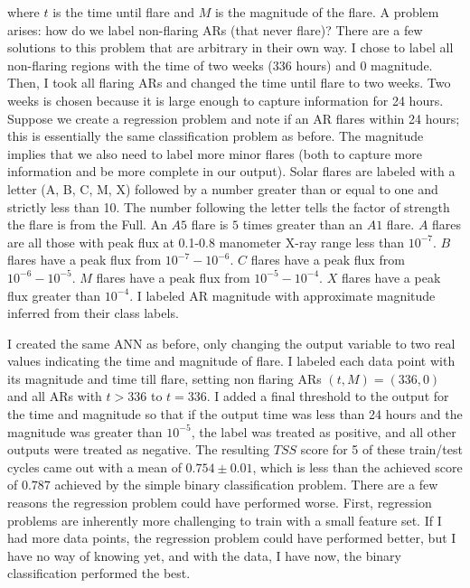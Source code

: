 \documentclass[defaultstyle,11pt]{thesis}
\begin{document}
\noindent where $t$ is the time until flare and $M$ is the magnitude of the flare. A problem arises: how do we label non-flaring ARs (that never flare)? There are a few solutions to this problem that are arbitrary in their own way. I chose to label all non-flaring regions with the time of two weeks (336 hours) and 0 magnitude. Then, I took all flaring ARs and changed the time until flare to two weeks. Two weeks is chosen because it is large enough to capture information for 24 hours. Suppose we create a regression problem and note if an AR flares within 24 hours; this is essentially the same classification problem as before. The magnitude implies that we also need to label more minor flares (both to capture more information and be more complete in our output). Solar flares are labeled with a letter (A, B, C, M, X) followed by a number greater than or equal to one and strictly less than 10. The number following the letter tells the factor of strength the flare is from the Full. An $A5$ flare is $5$ times greater than an $A1$ flare. $A$ flares are all those with peak flux at 0.1-0.8 manometer X-ray range less than $10^{-7}$. $B$ flares have a peak flux from $10^{-7}-10^{-6}$. $C$ flares have a peak flux from $10^{-6}-10^{-5}$. $M$ flares have a peak flux from $10^{-5}-10^{-4}$. $X$ flares have a peak flux greater than $10^{-4}$. I labeled AR magnitude with approximate magnitude inferred from their class labels. 

I created the same ANN as before, only changing the output variable to two real values indicating the time and magnitude of flare. I labeled each data point with its magnitude and time till flare, setting non flaring ARs $(t, M) = (336, 0)$ and all ARs with $t > 336$ to $t = 336$. I added a final threshold to the output for the time and magnitude so that if the output time was less than 24 hours and the magnitude was greater than $10^{-5}$, the label was treated as positive, and all other outputs were treated as negative. The resulting $TSS$ score for 5 of these train/test cycles came out with a mean of $0.754 \pm 0.01$, which is less than the achieved score of $0.787$ achieved by the simple binary classification problem. There are a few reasons the regression problem could have performed worse. First, regression problems are inherently more challenging to train with a small feature set. If I had more data points, the regression problem could have performed better, but I have no way of knowing yet, and with the data, I have now, the binary classification performed the best.
\end{document}
